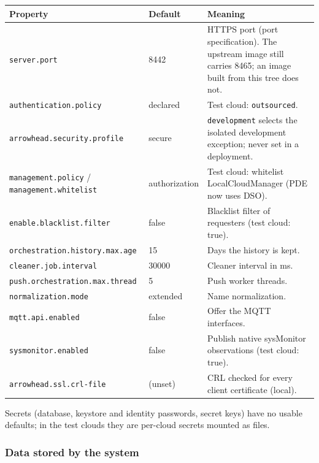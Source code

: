 \documentclass[a4paper]{arrowhead}
\begin{document}
\noindent\begin{longtable}{| p{5.4cm} | p{3.4cm} | p{6.4cm} |} \hline
\rowcolor{gray!33} Property & Default & Meaning \\ \hline \endhead
\texttt{server.\allowbreak{}port} & 8442 & HTTPS port (port specification). The upstream image still carries 8465; an image built from this tree does not. \\ \hline
\texttt{authentication.\allowbreak{}policy} & declared & Test cloud: \texttt{outsourced}. \\ \hline
\texttt{arrowhead.\allowbreak{}security.\allowbreak{}profile} & secure & \texttt{development} selects the isolated development exception; never set in a deployment. \\ \hline
\texttt{management.\allowbreak{}policy} / \texttt{management.\allowbreak{}whitelist} & authorization & Test cloud: whitelist LocalCloudManager (PDE now uses DSO). \\ \hline
\texttt{enable.\allowbreak{}blacklist.\allowbreak{}filter} & false & Blacklist filter of requesters (test cloud: true). \\ \hline
\texttt{orchestration.\allowbreak{}history.\allowbreak{}max.\allowbreak{}age} & 15 & Days the history is kept. \\ \hline
\texttt{cleaner.\allowbreak{}job.\allowbreak{}interval} & 30000 & Cleaner interval in ms. \\ \hline
\texttt{push.\allowbreak{}orchestration.\allowbreak{}max.\allowbreak{}thread} & 5 & Push worker threads. \\ \hline
\texttt{normalization.\allowbreak{}mode} & extended & Name normalization. \\ \hline
\texttt{mqtt.\allowbreak{}api.\allowbreak{}enabled} & false & Offer the MQTT interfaces. \\ \hline
\texttt{sysmonitor.\allowbreak{}enabled} & false & Publish native sysMonitor observations (test cloud: true). \\ \hline
\texttt{arrowhead.\allowbreak{}ssl.\allowbreak{}crl-\allowbreak{}file} & (unset) & CRL checked for every client certificate (local). \\ \hline
\end{longtable}

Secrets (database, keystore and identity passwords, secret keys) have no usable defaults; in the test clouds they are per-cloud secrets mounted as files.

\subsubsection{Data stored by the system}
\end{document}
